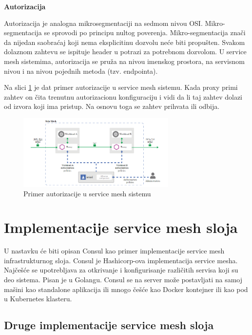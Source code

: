 \documentclass[a4paper,12pt]{report}
\begin{document}
\textbf{Autorizacija}\newline

Autorizacija je analogna mikrosegmentaciji na sedmom nivou OSI. Mikro-segmentacija se sprovodi po principu nultog poverenja. Mikro-segmentacija znači da nijedan saobraćaj koji nema eksplicitinu dozvolu neće biti propušten. Svakom dolaznom zahtevu se ispituje header u potrazi za potrebnom dozvolom. U service mesh sistemima, autorizacija se pruža na nivou imenskog prostora, na servisnom nivou i na nivou pojednih metoda (tzv. endpointa). \newline

Na slici \ref{fig:authorization-architecture} je dat primer autorizacije u service mesh sistemu. Kada proxy primi zahtev on čita trenutnu autorizacionu konfiguraciju i vidi da li taj zahtev dolazi od izvora koji ima pristup. Na osnovu toga se zahtev prihvata ili odbija. 

\begin{figure}[h]
    \centering
    \includegraphics[width=0.7\textwidth]{authorization_architecture}
    \caption{Primer autorizacije u service mesh sistemu}
    \label{fig:authorization-architecture}
\end{figure} 

\chapter{Implementacije service mesh sloja}

U nastavku će biti opisan Consul kao primer implementacije service mesh infrastrukturnog sloja. Consul je Hashicorp-ova implementacija service mesha. Najčešće se upotrebljava za otkrivanje i konfigurisanje različitih servisa koji su deo sistema. Pisan je u Golangu. Consul se na server može postavljati na samoj mašini kao standalone aplikacija ili mnogo češće kao Docker kontejner ili kao pod u Kubernetes klasteru. 

\section{Druge implementacije service mesh sloja}
\end{document}
